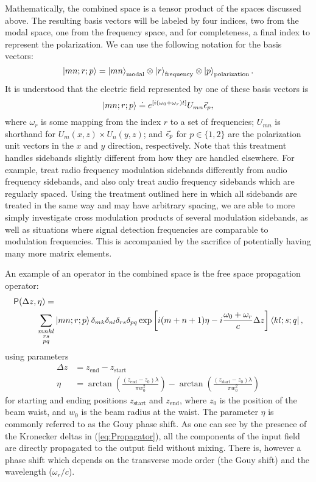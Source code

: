 Mathematically, the combined space is a tensor product of the spaces discussed above. %
The resulting basis vectors will be labeled by four indices, two from the modal space, one from the frequency space, and for completeness, a final index to represent the polarization. %
We can use the following notation for the basis vectors:
\begin{equation}
\left| mn;r;p \right>=\left| mn \right>_{\text{modal}}\otimes\left| r \right>_{\text{frequency}}\otimes\left| p \right>_{\text{polarization}}.
\end{equation}
It is understood that the electric field represented by one of these basis vectors is
\[
\left| mn;r;p \right> \doteq e^{\left[ i\left( \omega_0+\omega_r\right)t\right]} U_{mn}\vec{\epsilon}_p,
\]
where $\omega_r$ is some mapping from the index $r$ to a set of frequencies; $U_{mn}$ is shorthand for $U_m(x,z)\times U_n(y,z)$; and $\vec{\epsilon}_p$ for $p\in \{1,2\}$ are the polarization unit vectors in the $x$ and $y$ direction, respectively. %
Note that this treatment handles sidebands slightly different from how they are handled elsewhere. %
For example, \citet{Sigg:00} treat radio frequency modulation sidebands differently from audio frequency sidebands, and also only treat audio frequency sidebands which are regularly spaced. %
Using the treatment outlined here in which all sidebands are treated in the same way and may have arbitrary spacing, we are able to more simply investigate cross modulation products of several modulation sidebands, as well as situations where signal detection frequencies are comparable to modulation frequencies. %
This is accompanied by the sacrifice of potentially having many more matrix elements.

An example of an operator in the combined space is the free space propagation operator:
\begin{align}
\label{eq:Propagator}
\mathsf{P}(\Delta z,\eta) = & \\
\sum_{\substack{mnkl\\rs\\pq}}& \left| mn;r;p \right>
\delta_{mk}\delta_{nl}\delta_{rs}\delta_{pq}
\exp  \left[i(m+n+1)\eta
-i\frac{\omega_0+\omega_r}{c}\Delta z\right] 
\left< kl;s;q \right|, \notag
\end{align}
using parameters
\begin{align*}
\Delta z &= z_{\text{end}}-z_{\text{start}} \\
\eta &= \arctan \left( \frac{(z_{\text{end}}-z_0)\lambda}{\pi w_0^2}\right)- 
        \arctan \left( \frac{(z_{\text{start}}-z_0)\lambda}{\pi w_0^2}\right)
\end{align*}
for starting and ending positions $z_{\text{start}}$ and $z_{\text{end}}$, where $z_0$ is the position of the beam waist, and $w_0$ is the beam radius at the waist. %
The parameter $\eta$ is commonly referred to as the Gouy phase shift. %
As one can see by the presence of the Kronecker deltas in (\ref{eq:Propagator}), all the components of the input field are directly propagated to the output field without mixing. %
There is, however a phase shift which depends on the transverse mode order (the Gouy shift) and the wavelength ($\omega_r/c$).

